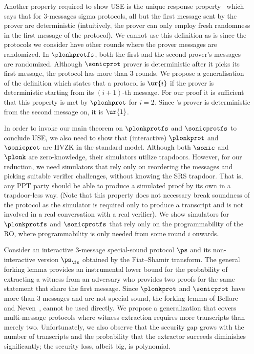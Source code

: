 Another property required to show USE is the unique response property~\cite{C:Fischlin05} which
says that for $3$-messages sigma
protocols, all but the first message sent by the prover are
deterministic (intuitively, the prover can only employ fresh randomness in the
first message of the protocol). We cannot use this definition as is since the protocols we consider have other rounds where the prover messages are randomized. In $\plonkprotfs$, both the first and the second prover's messages are randomized. Although $\sonicprot$ prover is deterministic after it picks its first message, the protocol has more than $3$ rounds. We propose a generalisation of the
definition which states that a protocol is $\ur{i}$ if the prover is
deterministic starting from its $(i + 1)$-th message. For our proof it is
sufficient that this property is met by $\plonkprot$ for $i = 2$. Since
\sonic{}'s prover is deterministic from the second message on, it is $\ur{1}$.


  In order to invoke our main theorem on $\plonkprotfs$ and
$\sonicprotfs$ to conclude USE, we also need to show that (interactive)
$\plonkprot$ and $\sonicprot$ are HVZK in the standard model. Although both
$\sonic$ and $\plonk$ are zero-knowledge, their simulators utilize
trapdoors. However, for our reduction, we need simulators that rely only on
reordering the messages and picking suitable verifier challenges, without
knowing the SRS trapdoor.  That is, any PPT party should be able to produce a
simulated proof by its own in a trapdoor-less way. (Note that this property does
not necessary break soundness of the protocol as the simulator is required only
to produce a transcript and is not involved in a real conversation with a real
verifier). We show simulators for $\plonkprotfs$ and $\sonicprotfs$ that rely
only on the programmability of the RO, where programmability is only needed from
some round $i$ onwards.  

Consider an interactive $3$-message special-sound protocol $\ps$ and its
non-interactive version $\ps_\fs$ obtained by the Fiat--Shamir transform. The
general forking lemma provides an instrumental lower bound for the probability
of extracting a witness from an adversary who provides two proofs for the same
statement that share the first message. Since $\plonkprot$ and $\sonicprot$ have
more than $3$ messages and are not special-sound, the forking lemma of Bellare
and Neven~\cite{CCS:BelNev06}, cannot be used directly. We propose a
generalization that covers multi-message protocols where witness extraction
requires more transcripts than merely two.  Unfortunately, we also observe that
the security gap grows with the number of transcripts and the probability that
the extractor succeeds diminishes significantly; the security loss, albeit big, is polynomial.

